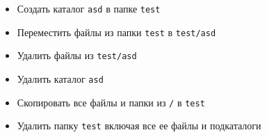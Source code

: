 \documentclass[a4paper,12pt]{article}
\begin{document}
\begin{flushleft}
\begin{enumerate}
\begin{itemize}
        \item Создать каталог \texttt{asd} в папке \texttt{test}
        \item Переместить файлы из папки \texttt{test} в \texttt{test/asd}
        \item Удалить файлы из \texttt{test/asd}
        \item Удалить каталог \texttt{asd}
        \item Скопировать все файлы и папки из \texttt{/} в \texttt{test}
        \item Удалить папку \texttt{test} включая все ее файлы и подкаталоги
      \end{itemize}
    \end{enumerate}
  \end{flushleft}
\end{document}

